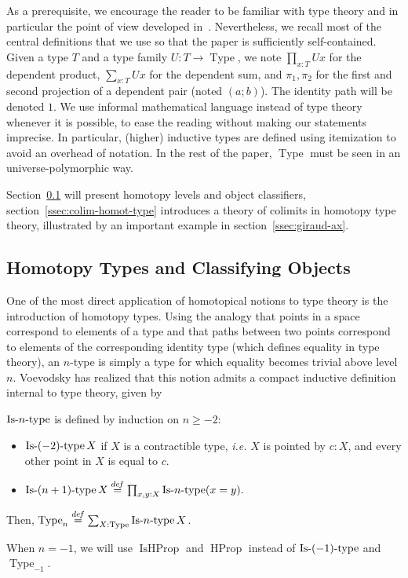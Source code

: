 \documentclass[notfinal]{jfrarticle}
\DeclareMathOperator{\Type}{Type}
\DeclareMathOperator{\HProp}{HProp}
\DeclareMathOperator{\IsHProp}{IsHProp}
\newcommand \defeq {\overset{de\hspace{-0.2ex}f}{=}}
\def\mymathhyphen{{\hbox{-}}}
\newcommand{\IsType}[1]
{\mathop{\mathrm{Is\mymathhyphen}#1\mathrm{\mymathhyphen type}} }
\newcommand{\ie}{\emph{i.e.}}
\begin{document}
As a prerequisite, we encourage the reader to be familiar with type theory and
in particular the point of view developed
in~\cite{hottbook}. Nevertheless, we recall most of the central definitions 
that we use so that the paper is sufficiently self-contained.
%
Given a type $T$ and a type family $U : T \to \Type$, we note
$\prod_{x:T} U x$ for the dependent product, $\sum_{x:T} U x$ for the dependent
sum, and $\pi_1, \pi_2$ for the first and second projection of a
dependent pair (noted $(a;b)$). The identity path will be denoted
$1$. We use informal mathematical language
instead of type theory whenever it is possible, to ease the reading
without making our statements imprecise. In particular, (higher)
inductive types are defined using itemization to avoid an overhead of
notation. In the rest of the paper, $\Type$ must be seen in an
universe-polymorphic way.

Section~\ref{ssec:hott} will present homotopy levels and object
classifiers, section~\ref{ssec:colim-homot-type} introduces a theory
of colimits in homotopy type theory, illustrated by an important
example in section~\ref{ssec:giraud-ax}.

 
 \subsection{Homotopy Types and Classifying Objects}
\label{ssec:hott}

One of the most direct application of homotopical notions to type
theory is the introduction of homotopy types. 
%
Using the analogy that points in a space correspond to elements of a
type and that paths between two points correspond to 
elements of the corresponding identity type (which defines equality in type theory),  
%
an $n$-type is simply a type
for which equality becomes trivial above level $n$. 
%
Voevodsky has realized that this notion admits a compact inductive definition
internal to type theory, given by
\begin{defi}
  $\IsType n$ is defined by induction on $n\geqslant -2$:
  \begin{itemize}
  \item $\IsType {(-2)} X$ if $X$ is a contractible type, \ie{} $X$
    is pointed by $c:X$, and every other point in $X$ is equal to $c$.
  \item $\IsType {(n+1)} X \defeq \prod_{x,y:X} \IsType n (x=y).$
  \end{itemize}
  Then, $\Type_n \defeq \sum_{X:\Type} \IsType n X$.
\end{defi}
%
When $n=-1$, we will use $\IsHProp$ and $\HProp$ instead of
$\IsType{(-1)}$ and $\Type_{-1}$. 
\end{document}
